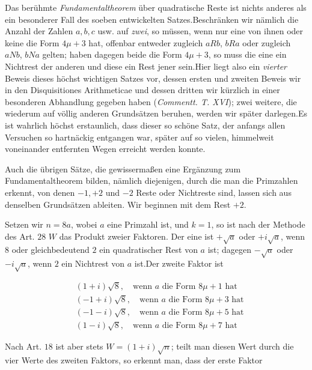 
Das berühmte \textit{Fundamentaltheorem} über quadratische Reste ist nichts anderes als ein besonderer Fall des soeben entwickelten Satzes.\quad Beschränken wir nämlich die Anzahl der Zahlen $a,b,c$ usw. auf \textit{zwei}, so müssen, wenn nur eine von ihnen oder keine die Form $4\mu+3$ hat, offenbar entweder zugleich $aRb$, $bRa$ oder zugleich $aNb$, $bNa$ gelten; haben dagegen beide die Form $4\mu+3$, so muss die eine ein Nichtrest der anderen und diese ein Rest jener sein.\quad Hier liegt also ein \textit{vierter} Beweis dieses höchst wichtigen Satzes vor, dessen ersten und zweiten Beweis wir in den Disquisitiones Arithmeticae und dessen dritten wir kürzlich in einer besonderen Abhandlung gegeben haben (\textit{Commentt. T. XVI}); zwei weitere, die wiederum auf völlig anderen Grundsätzen beruhen, werden wir später darlegen.\quad Es ist wahrlich höchst erstaunlich, dass dieser so schöne Satz, der anfangs allen Versuchen so hartnäckig entgangen war, später auf so vielen, himmelweit voneinander entfernten Wegen erreicht werden konnte.


Auch die übrigen Sätze, die gewissermaßen eine Ergänzung zum Fundamentaltheorem bilden, nämlich diejenigen, durch die man die Primzahlen erkennt, von denen $-1,+2$ und $-2$ Reste oder Nichtreste sind, lassen sich aus denselben Grundsätzen ableiten. Wir beginnen mit dem Rest $+2$.

Setzen wir $n=8a$, wobei $a$ eine Primzahl ist, und $k=1$, so ist nach der Methode des Art. $28$ $W$ das Produkt zweier Faktoren. Der eine ist $+\surd a$ oder $+i\surd a$, wenn $8$ oder gleichbedeutend $2$ ein quadratischer Rest von $a$ ist; dagegen $-\surd a$ oder $-i\surd a$, wenn $2$ ein Nichtrest von $a$ ist.\quad Der zweite Faktor ist

\[
\begin{aligned}
&(1+i)\surd8,\quad\text{wenn }a\text{ die Form }8\mu+1\text{ hat}\\
&(-1+i)\surd8,\quad\text{wenn }a\text{ die Form }8\mu+3\text{ hat}\\
&(-1-i)\surd8,\quad\text{wenn }a\text{ die Form }8\mu+5\text{ hat}\\
&(1-i)\surd8,\quad\text{wenn }a\text{ die Form }8\mu+7\text{ hat}
\end{aligned}
\]

Nach Art. $18$ ist aber stets $W=(1+i)\surd n$; teilt man diesen Wert durch die vier Werte des zweiten Faktors, so erkennt man, dass der erste Faktor


